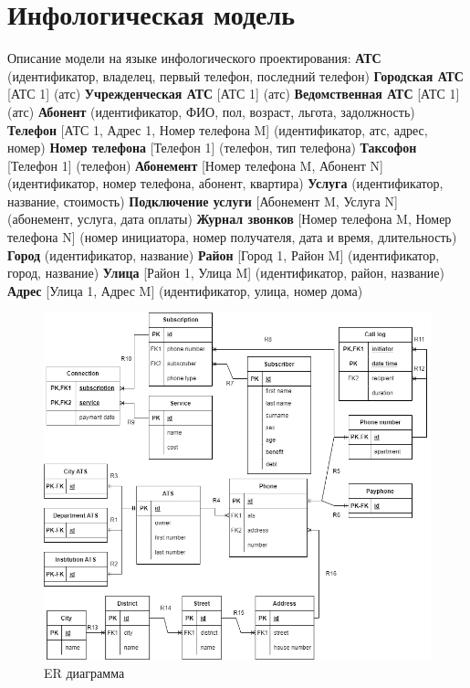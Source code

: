 \documentclass{report}
\begin{document}
\section{Инфологическая модель}
Описание модели на языке инфологического проектирования:
\newline\textbf{АТС} (идентификатор, владелец, первый телефон, последний телефон)
\newline\textbf{Городская АТС} [АТС 1] (атс)
\newline\textbf{Учрежденческая АТС} [АТС 1] (атс)
\newline\textbf{Ведомственная АТС} [АТС 1] (атс)
\newline\textbf{Абонент} (идентификатор, ФИО, пол, возраст, льгота, задолжность)
\newline\textbf{Телефон} [АТС 1, Адрес 1, Номер телефона M] (идентификатор, атс, адрес, номер)
\newline\textbf{Номер телефона} [Телефон 1] (телефон, тип телефона)
\newline\textbf{Таксофон} [Телефон 1] (телефон)
\newline\textbf{Абонемент} [Номер телефона M, Абонент N] (идентификатор, 
номер телефона, абонент, квартира)
\newline\textbf{Услуга} (идентификатор, название, стоимость)
\newline\textbf{Подключение услуги} [Абонемент M, Услуга N] (абонемент, услуга, дата оплаты)
\newline\textbf{Журнал звонков} [Номер телефона M, Номер телефона N] 
(номер инициатора, номер получателя, дата и время, длительность)
\newline\textbf{Город} (идентификатор, название)
\newline\textbf{Район} [Город 1, Район M] (идентификатор, город, название)
\newline\textbf{Улица} [Район 1, Улица M] (идентификатор, район, название)
\newline\textbf{Адрес} [Улица 1, Адрес M] (идентификатор, улица, номер дома)

\begin{figure}[!ht]
    \begin{center}
    \includegraphics[width=\textwidth]{resources/er.png}
    \caption{ER диаграмма}
    \end{center}
\end{figure}
\end{document}
